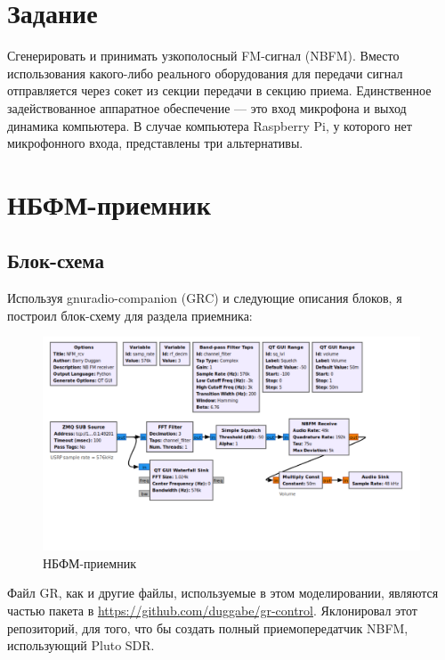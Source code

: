 \documentclass[12pt]{article}
\begin{document}
\begin{titlepage}
    
\end{titlepage}



\section*{Задание}
Сгенерировать и принимать узкополосный FM-сигнал (NBFM). Вместо использования какого-либо реального оборудования для передачи сигнал отправляется через сокет из секции передачи в секцию приема. Единственное задействованное аппаратное обеспечение — это вход микрофона и выход динамика компьютера. В случае компьютера Raspberry Pi, у которого нет микрофонного входа, представлены три альтернативы.
\section*{НБФМ-приемник}
\subsection*{Блок-схема}
Используя gnuradio-companion (GRC) и следующие описания блоков, я построил блок-схему для раздела приемника:

\begin{figure}[H]
    \centering
    \includegraphics[width=1\textwidth]{pictures/1.png}
    \caption{НБФМ-приемник}
\end{figure}
Файл GR, как и другие файлы, используемые в этом моделировании, являются частью пакета в \href{https://github.com/duggabe/gr-control}{https://github.com/duggabe/gr-control}. Яклонировал этот репозиторий, для того, что бы создать полный приемопередатчик NBFM, использующий Pluto SDR.
\end{document}
